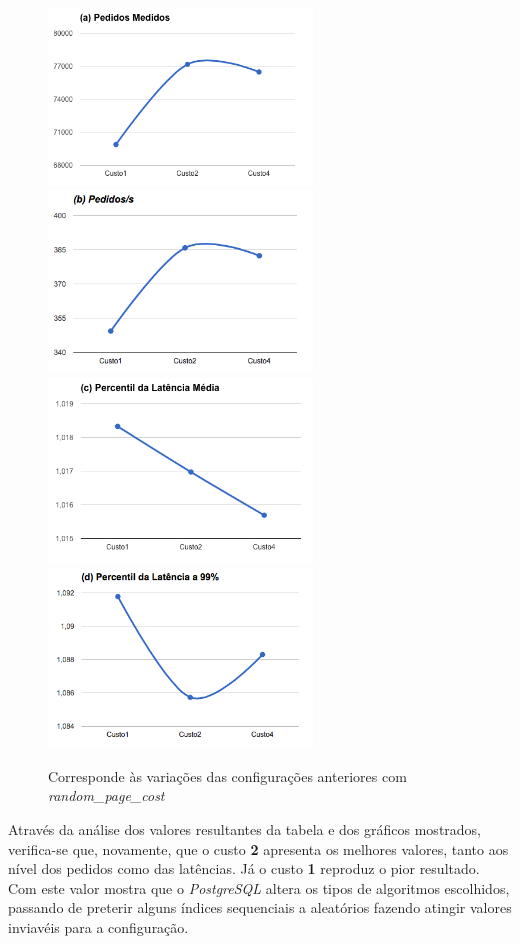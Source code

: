 \begin{figure}[ht!]
\centering
\includegraphics[width=70mm]{img/questao_3/sb_ecs_cs_vacuum_rpc_a.png}
\includegraphics[width=70mm]{img/questao_3/sb_ecs_cs_vacuum_rpc_b.png}
\includegraphics[width=70mm]{img/questao_3/sb_ecs_cs_vacuum_rpc_c.png}
\includegraphics[width=70mm]{img/questao_3/sb_ecs_cs_vacuum_rpc_d.png}
\caption{Corresponde às variações das configurações anteriores com \textit{random\_page\_cost}}
\end{figure}

Através da análise dos valores resultantes da tabela e dos gráficos mostrados, verifica-se que, novamente, que o custo \textbf{2} apresenta os melhores valores, tanto aos nível dos pedidos como das latências. Já o custo \textbf{1} reproduz o pior resultado. Com este valor mostra que o \textit{PostgreSQL} altera os tipos de algoritmos escolhidos, passando de preterir alguns índices sequenciais a aleatórios fazendo atingir valores inviavéis para a configuração.

